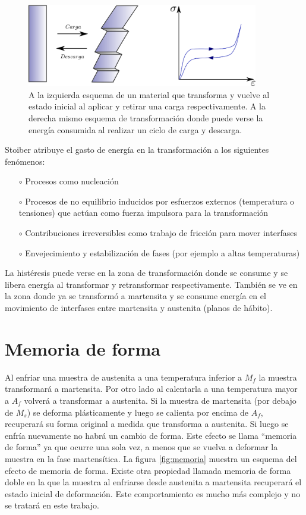 \documentclass[a4paper,12pt,fleqn,twoside,openany]{book}
\begin{document}
\begin{figure}[h]
 \centering
 \includegraphics[width=0.9\textwidth]{pseudoel.eps}
 \caption{A la izquierda esquema de un material que transforma y vuelve al estado inicial al aplicar y retirar una carga respectivamente.
 A la derecha mismo esquema de transformación donde puede verse la energía consumida al realizar un ciclo de carga y descarga.}
 \label{fig:pseudoel}
 \end{figure}
 
Stoiber \cite{stoiber} atribuye el gasto de energía en la transformación a los siguientes fenómenos:
\begin{itemize}
 \item[$\circ$] Procesos como nucleación
 \item[$\circ$] Procesos de no equilibrio inducidos por esfuerzos externos (temperatura o tensiones) que actúan como fuerza impulsora para la 
 transformación
 \item[$\circ$] Contribuciones irreversibles como trabajo de fricción para mover interfases
 \item[$\circ$] Envejecimiento y estabilización de fases (por ejemplo a altas temperaturas) 
\end{itemize}

La histéresis puede verse en la zona de transformación donde se consume y se libera energía al transformar y retransformar respectivamente. 
También se ve en la zona donde ya se transformó a martensita y se consume energía en el movimiento de interfases entre martensita y austenita (planos de hábito). 


\section{Memoria de forma}

 Al enfriar una muestra de austenita a una temperatura inferior a $M_{f}$ la muestra transformará a martensita. Por otro lado al calentarla a una temperatura mayor 
a $A_{f}$ volverá a transformar a austenita. Si la muestra de martensita (por debajo de $M_{s}$) se deforma plásticamente y luego se calienta por encima de $A_{f}$, recuperará su 
forma original a medida que transforma a austenita. Si luego se enfría nuevamente no habrá un cambio de forma. Este efecto se llama “memoria de forma” ya que ocurre 
una sola vez, a menos que se vuelva a deformar la muestra en la fase martensítica. La figura \ref{fig:memoria} muestra un esquema del efecto de memoria de forma. Existe otra propiedad llamada memoria de forma doble en la que la muestra al 
enfriarse desde austenita a martensita recuperará el estado inicial de deformación. Este comportamiento es mucho más complejo y no se tratará en este trabajo.
\end{document}
